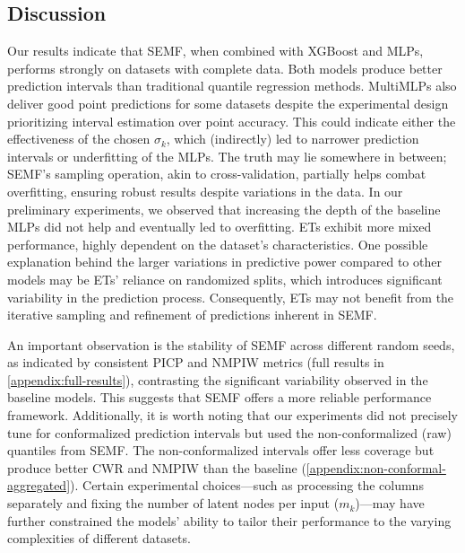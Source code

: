 \documentclass{article}
\begin{document}
\subsection{Discussion}
Our results indicate that SEMF, when combined with XGBoost and MLPs, performs strongly on datasets with complete data. Both models produce better prediction intervals than traditional quantile regression methods. MultiMLPs also deliver good point predictions for some datasets despite the experimental design prioritizing interval estimation over point accuracy. This could indicate either the effectiveness of the chosen $\sigma_{k}$, which (indirectly) led to narrower prediction intervals or underfitting of the MLPs. The truth may lie somewhere in between; SEMF's sampling operation, akin to cross-validation, partially helps combat overfitting, ensuring robust results despite variations in the data. In our preliminary experiments, we observed that increasing the depth of the baseline MLPs did not help and eventually led to overfitting. ETs exhibit more mixed performance, highly dependent on the dataset's characteristics. One possible explanation behind the larger variations in predictive power compared to other models may be ETs' reliance on randomized splits, which introduces significant variability in the prediction process. Consequently, ETs may not benefit from the iterative sampling and refinement of predictions inherent in SEMF.

An important observation is the stability of SEMF across different random seeds, as indicated by consistent PICP and NMPIW metrics (full results in \autoref{appendix:full-results}), contrasting the significant variability observed in the baseline models. This suggests that SEMF offers a more reliable performance framework. Additionally, it is worth noting that our experiments did not precisely tune for conformalized prediction intervals but used the non-conformalized (raw) quantiles from SEMF. The non-conformalized intervals offer less coverage but produce better CWR and NMPIW than the baseline (\autoref{appendix:non-conformal-aggregated}). Certain experimental choices—such as processing the columns separately and fixing the number of latent nodes per input ($m_k$)—may have further constrained the models' ability to tailor their performance to the varying complexities of different datasets.
\end{document}
